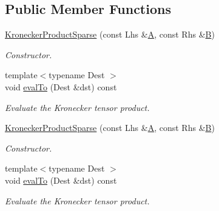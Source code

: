 \subsection*{Public Member Functions}
\begin{DoxyCompactItemize}
\item 
\mbox{\label{class_eigen_1_1_kronecker_product_sparse_ac0a69ba844415fbe79e6514f32b41fb5}} 
\hyperlink{class_eigen_1_1_kronecker_product_sparse_ac0a69ba844415fbe79e6514f32b41fb5}{Kronecker\+Product\+Sparse} (const Lhs \&\hyperlink{group___core___module_class_eigen_1_1_matrix}{A}, const Rhs \&\hyperlink{group___core___module_class_eigen_1_1_matrix}{B})
\begin{DoxyCompactList}\small\item\em Constructor. \end{DoxyCompactList}\item 
\mbox{\label{class_eigen_1_1_kronecker_product_sparse_a8b7269c23294765e0965b70b5af2557b}} 
{\footnotesize template$<$typename Dest $>$ }\\void \hyperlink{class_eigen_1_1_kronecker_product_sparse_a8b7269c23294765e0965b70b5af2557b}{eval\+To} (Dest \&dst) const
\begin{DoxyCompactList}\small\item\em Evaluate the Kronecker tensor product. \end{DoxyCompactList}\item 
\mbox{\label{class_eigen_1_1_kronecker_product_sparse_ac0a69ba844415fbe79e6514f32b41fb5}} 
\hyperlink{class_eigen_1_1_kronecker_product_sparse_ac0a69ba844415fbe79e6514f32b41fb5}{Kronecker\+Product\+Sparse} (const Lhs \&\hyperlink{group___core___module_class_eigen_1_1_matrix}{A}, const Rhs \&\hyperlink{group___core___module_class_eigen_1_1_matrix}{B})
\begin{DoxyCompactList}\small\item\em Constructor. \end{DoxyCompactList}\item 
\mbox{\label{class_eigen_1_1_kronecker_product_sparse_a8b7269c23294765e0965b70b5af2557b}} 
{\footnotesize template$<$typename Dest $>$ }\\void \hyperlink{class_eigen_1_1_kronecker_product_sparse_a8b7269c23294765e0965b70b5af2557b}{eval\+To} (Dest \&dst) const
\begin{DoxyCompactList}\small\item\em Evaluate the Kronecker tensor product. \end{DoxyCompactList}\end{DoxyCompactItemize}
